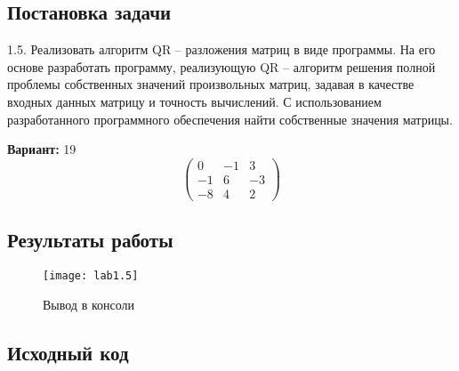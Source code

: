 \subsection{Постановка задачи}
1.5. Реализовать алгоритм QR – разложения матриц в виде программы. На его основе разработать программу, реализующую QR – алгоритм решения полной проблемы собственных значений произвольных матриц, задавая в качестве входных данных матрицу и точность вычислений. С использованием разработанного программного обеспечения найти собственные значения матрицы.

{\bfseries Вариант:} 19
\begin{equation}
      \begin{pmatrix}
        0 & -1 & 3\\
        -1 & 6 & -3\\
        -8 & 4 & 2
      \end{pmatrix}
\end{equation}
\pagebreak

\subsection{Результаты работы}

\begin{figure}[h!]
\centering
\texttt{[image: lab1.5]}
\caption{Вывод в консоли}
\end{figure}
\pagebreak

\vfill

\subsection{Исходный код}


\pagebreak
